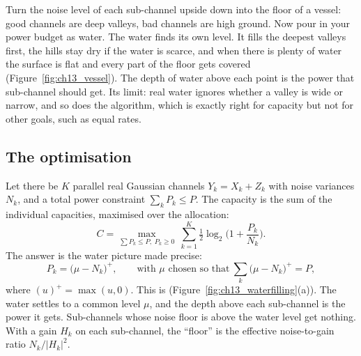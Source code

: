 \begin{analogy}
Turn the noise level of each sub-channel upside down into the floor of a vessel: good channels are
deep valleys, bad channels are high ground. Now pour in your power budget as water. The water
finds its own level. It fills the deepest valleys first, the hills stay dry if the water is scarce,
and when there is plenty of water the surface is flat and every part of the floor gets covered
(Figure~\ref{fig:ch13_vessel}). The depth of water above each point is the power that sub-channel
should get. Its limit: real water ignores whether a valley is wide or narrow, and so does the
algorithm, which is exactly right for capacity but not for other goals, such as equal rates.
\end{analogy}


\subsection{The optimisation}

Let there be $K$ parallel real Gaussian channels $Y_k=X_k+Z_k$ with noise variances $N_k$, and a
total power constraint $\sum_kP_k\le P$. The capacity is the sum of the individual capacities,
maximised over the allocation:
\begin{equation}
C=\max_{\sum P_k\le P,\;P_k\ge0}\ \sum_{k=1}^K\tfrac12\log_2\!\Big(1+\frac{P_k}{N_k}\Big).
\label{eq:ch13:parallel}
\end{equation}
The answer is the water picture made precise:
\begin{equation}
P_k=\big(\mu-N_k\big)^+,\qquad\text{with }\mu\text{ chosen so that}\ \sum_k\big(\mu-N_k\big)^+=P,
\label{eq:ch13:wf}
\end{equation}
where $(u)^+=\max(u,0)$. This is  (Figure~\ref{fig:ch13_waterfilling}(a)). The
water settles to a common level $\mu$, and the depth above each sub-channel is the power it gets.
Sub-channels whose noise floor is above the water level get nothing. With a gain $H_k$ on each
sub-channel, the ``floor'' is the effective noise-to-gain ratio $N_k/|H_k|^2$.


